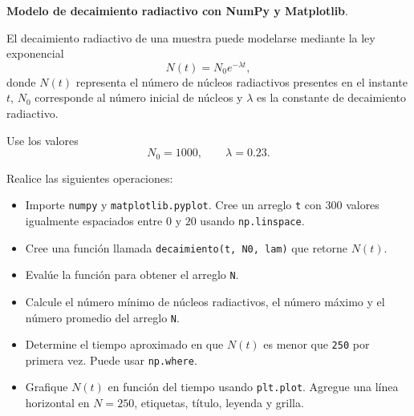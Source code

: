 \providecommand{\Needspace}[1]{}
\Needspace{8\baselineskip}
\item \textbf{Modelo de decaimiento radiactivo con NumPy y Matplotlib}.
\nopagebreak[4]

\begin{tcolorbox}[colback=blue!2!white,colframe=blue!55!black,title={Enunciado},
                  before skip=3pt,after skip=5pt,boxsep=3pt,top=3pt,bottom=3pt,
                  breakable]
\small
\raggedright
El decaimiento radiactivo de una muestra puede modelarse mediante la ley
exponencial
\[
N(t)=N_0e^{-\lambda t},
\]
donde \(N(t)\) representa el número de núcleos radiactivos presentes en el
instante \(t\), \(N_0\) corresponde al número inicial de núcleos y \(\lambda\)
es la constante de decaimiento radiactivo.

Use los valores
\[
N_0 = 1000,
\qquad
\lambda = 0.23.
\]

Realice las siguientes operaciones:

\begin{itemize}
\setlength{\topsep}{4pt}
\setlength{\itemsep}{3pt}
\setlength{\parsep}{0pt}
\item[(a)] Importe \texttt{numpy} y \texttt{matplotlib.pyplot}. Cree un arreglo
\texttt{t} con 300 valores igualmente espaciados entre \(0\) y \(20\) usando
\texttt{np.linspace}.
\item[(b)] Cree una función llamada \texttt{decaimiento(t, N0, lam)} que retorne
\(N(t)\).
\item[(c)] Evalúe la función para obtener el arreglo \texttt{N}.
\item[(d)] Calcule el número mínimo de núcleos radiactivos, el número máximo y
el número promedio del arreglo \texttt{N}.
\item[(e)] Determine el tiempo aproximado en que \(N(t)\) es menor que
\texttt{250} por primera vez. Puede usar \texttt{np.where}.
\item[(f)] Grafique \(N(t)\) en función del tiempo usando \texttt{plt.plot}.
Agregue una línea horizontal en \(N=250\), etiquetas, título, leyenda y grilla.
\end{itemize}
\end{tcolorbox}

